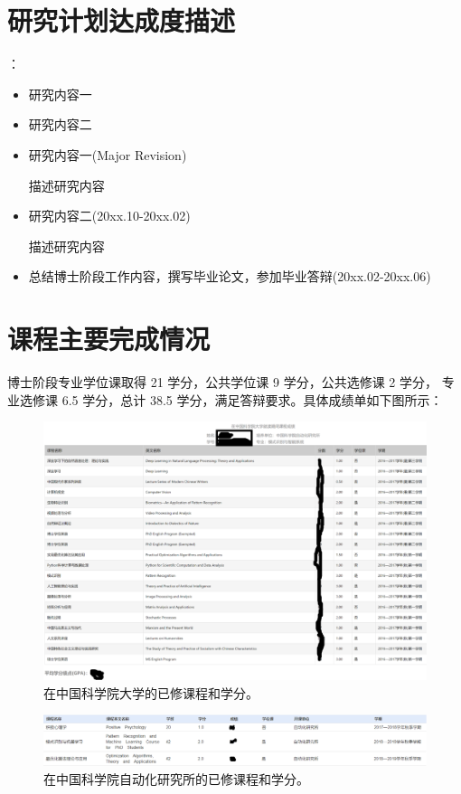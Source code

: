 

\chapter{研究计划达成度描述}
：
\begin{itemize}
	\item 研究内容一
	\item 研究内容二
\end{itemize}


\begin{itemize}
\item 研究内容一(Major Revision)

描述研究内容

\item 研究内容二(20xx.10-20xx.02)

描述研究内容

\item 总结博士阶段工作内容，撰写毕业论文，参加毕业答辩(20xx.02-20xx.06)
\end{itemize}

\chapter{课程主要完成情况}
博士阶段专业学位课取得 21 学分，公共学位课 9 学分，公共选修课 2 学分，
专业选修课 6.5 学分，总计 38.5 学分，满足答辩要求。具体成绩单如下图所示：
\begin{figure}[h]
	\begin{center}
		\includegraphics[width=0.99\linewidth]{Img/Others/score.png}
	\end{center}
	\caption{在中国科学院大学的已修课程和学分。
	}
	\label{fig:score}
\end{figure}
\begin{figure}[h]
	\begin{center}
		\includegraphics[width=0.99\linewidth]{Img/Others/score2.png}
	\end{center}
	\caption{在中国科学院自动化研究所的已修课程和学分。
	}
	\label{fig:score2}
\end{figure}

